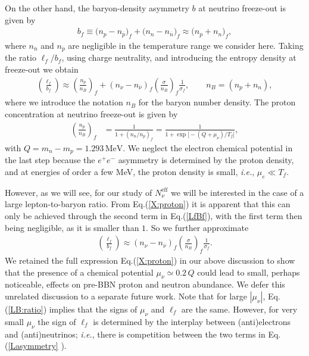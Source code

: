 On the other hand, the baryon-density asymmetry $b$ at neutrino freeze-out is given by
\begin{align}
\label{Basymmetry}
b_f \equiv\big(n_p-n_{\overline{p}}\big)_f+\big(n_n-n_{\overline{n}}\big)_f \approx \big(n_p+n_n\big)_f,
\end{align}
where $n_{\overline{n}}$ and $n_{\overline{p}}$ are negligible in the temperature range we consider here. Taking the ratio $\ell_f/b_f$, using charge neutrality, and introducing the entropy density at freeze-out we obtain
\begin{align}\label{LfBf}
\left(\frac{\ell_f}{b_f}\right) 
\approx\left(\frac{n_p}{n_B} \right)_f+\left(n_{\nu}-n_{\overline{\nu}}\right)_f \left(\frac{\sigma}{n_B}\right)_f \frac{1}{\sigma_f},\qquad n_B=(n_p+n_n),
\end{align}
where we introduce the notation $n_B$ for the baryon number density. The proton concentration at neutrino freeze-out is given by
\begin{align}
\label{X:proton}
\left(\frac{n_p}{n_B}\right)_f&=\frac{1}{1+(n_n/n_p)_f}=\frac{1}{1+\exp{\big[-\left(Q+\mu_\nu\right)/T_f\big]}},
\end{align}
with $Q=m_n-m_p=1.293\,\mathrm{MeV}$. We neglect the electron chemical potential in the last step because the $e^+e^-$ asymmetry is determined by the proton density, and at energies of order a few MeV, the proton density is small, {\it i.e.\/}, $\mu_e\ll T_f$. 

However, as we will see, for our study of $N_\nu^{\mathrm{eff}}$ we will be interested in the case of a large lepton-to-baryon ratio. From Eq.\;(\ref{X:proton}) it is apparent that this can only be achieved through the second term in Eq.\;(\ref{LfBf}), with the first term then being negligible, as it is smaller than $1$. So we further approximate
\begin{align}\label{LB:ratio}
\left(\frac{\ell_f}{b_f}\right) 
\approx\left(n_{\nu}-n_{\overline{\nu}}\right)_f \left(\frac{\sigma}{n_B}\right)_f \frac{1}{\sigma_f}.
\end{align}
We retained the full expression Eq.\;(\ref{X:proton}) in our above discussion to show that the presence of a chemical potential $\mu_\nu\simeq 0.2\,Q$ could lead to small, perhaps noticeable, effects on pre-BBN proton and neutron abundance. We defer this unrelated discussion to a separate future work. Note that for large $|\mu_\nu|$, Eq.\;(\ref{LB:ratio}) implies that the signs of $\mu_\nu$ and $\ell_f$ are the same. However, for very small $\mu_\nu$ the sign of $\ell_f$ is determined by the interplay between (anti)electrons and (anti)neutrinos; {\it i.e.\/}, there is competition between the two terms in Eq.\;(\ref{Lasymmetry} ).

